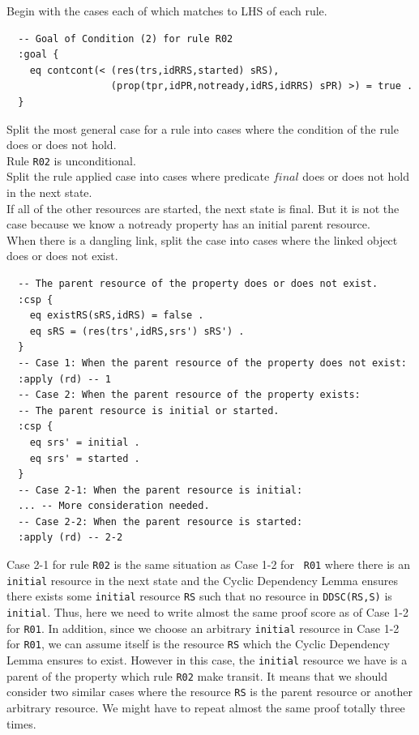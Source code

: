 \documentclass[12pt]{report}
\newcommand{\stt}[1]{{\small{\tt {#1}}}}
\begin{document}
 Begin with the cases each of which matches to
LHS of each rule.
\small
\begin{verbatim}
  -- Goal of Condition (2) for rule R02
  :goal {
    eq contcont(< (res(trs,idRRS,started) sRS),
                  (prop(tpr,idPR,notready,idRS,idRRS) sPR) >) = true .
  }
\end{verbatim}
\normalsize
 Split the most general case for a rule into
cases where the condition of the rule does or does not hold. \\
Rule {\tt R02} is unconditional.\\
 Split the rule applied case into cases where
predicate $final$ does or does not hold in the next state.\\
If all of the other resources are started, the next state is final.
But it is not the case because we know a notready property has
an initial parent resource. \\
 When there is a
dangling link, split the case into cases where the linked object does
or does not exist. 
\small
\begin{verbatim}
  -- The parent resource of the property does or does not exist.
  :csp {
    eq existRS(sRS,idRS) = false .
    eq sRS = (res(trs',idRS,srs') sRS') .
  }
  -- Case 1: When the parent resource of the property does not exist:
  :apply (rd) -- 1
  -- Case 2: When the parent resource of the property exists:
  -- The parent resource is initial or started.
  :csp {
    eq srs' = initial .
    eq srs' = started .
  }
  -- Case 2-1: When the parent resource is initial:
  ... -- More consideration needed.
  -- Case 2-2: When the parent resource is started:
  :apply (rd) -- 2-2
\end{verbatim}
\normalsize
Case 2-1 for rule {\tt R02} is the same situation as Case 1-2 for {\tt
  R01} where there is an {\tt initial} resource in the next state and
the Cyclic Dependency Lemma ensures there exists some {\tt initial}
resource {\tt RS} such that no resource in \stt{DDSC(RS,S)} is {\tt
  initial}. Thus, here we need to write almost the same proof score as
of Case 1-2 for {\tt R01}. In addition, since we choose an arbitrary
{\tt initial} resource in Case 1-2 for {\tt R01}, we can assume itself
is the resource {\tt RS} which the Cyclic Dependency Lemma ensures to
exist. However in this case, the {\tt initial} resource we have is
a parent of the property which rule {\tt R02} make transit. It means
that we should consider two similar cases where the resource {\tt RS}
is the parent resource or another arbitrary resource. We might have 
to repeat almost the same proof totally three times.
\end{document}

